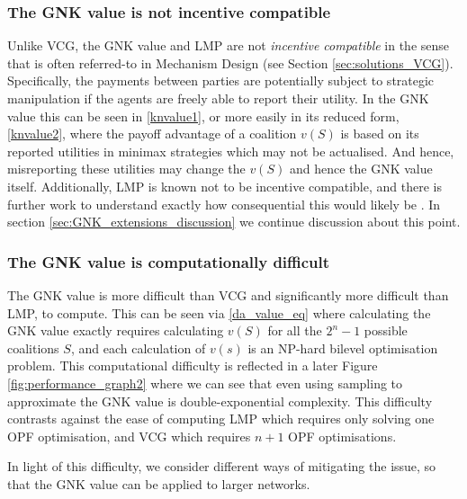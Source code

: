 \subsubsection*{The GNK value is not incentive compatible}
Unlike VCG, the GNK value and LMP are not \emph{incentive compatible} in the sense that is often referred-to in Mechanism Design (see Section \ref{sec:solutions_VCG}).
Specifically, the payments between parties are potentially subject to strategic manipulation if the agents are freely able to report their utility.
In the GNK value this can be seen in \eqref{knvalue1}, or more easily in its reduced form, \eqref{knvalue2}, where the payoff advantage of a coalition $v(S)$ is based on its reported utilities in minimax strategies which may not be actualised.
And hence, misreporting these utilities may change the $v(S)$ and hence the GNK value itself.
Additionally, LMP is known not to be incentive compatible, and there is further work to understand exactly how consequential this would likely be \cite{8054716}.
In section \ref{sec:GNK_extensions_discussion} we continue discussion about this point.

\subsubsection*{The GNK value is computationally difficult}
The GNK value is more difficult than VCG and significantly more difficult than LMP, to compute.
This can be seen via \eqref{da_value_eq} where calculating the GNK value exactly requires calculating $v(S)$ for all the $2^n-1$ possible coalitions $S$, and each calculation of $v(s)$ is an NP-hard bilevel optimisation problem.
This computational difficulty is reflected in a later Figure \ref{fig:performance_graph2} where we can see that even using sampling to approximate the GNK value is double-exponential complexity. 
This difficulty contrasts against the ease of computing LMP which requires only solving one OPF optimisation, and VCG which requires $n+1$ OPF optimisations.

In light of this difficulty, we consider different ways of mitigating the issue, so that the GNK value can be applied to larger networks.


